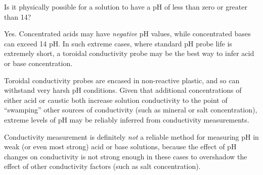 

Is it physically possible for a solution to have a pH of less than zero or greater than 14?







Yes.  Concentrated acids may have {\it negative} pH values, while concentrated bases can exceed 14 pH.  In such extreme cases, where standard pH probe life is extremely short, a toroidal conductivity probe may be the best way to infer acid or base concentration.

\vskip 10pt

Toroidal conductivity probes are encased in non-reactive plastic, and so can withstand very harsh pH conditions.  Given that additional concentrations of either acid or caustic both increase solution conductivity to the point of ``swamping'' other sources of conductivity (such as mineral or salt concentration), extreme levels of pH may be reliably inferred from conductivity measurements.

Conductivity measurement is definitely {\it not} a reliable method for measuring pH in weak (or even most strong) acid or base solutions, because the effect of pH changes on conductivity is not strong enough in these cases to overshadow the effect of other conductivity factors (such as salt concentration).











